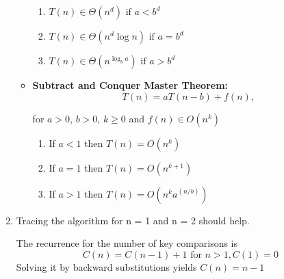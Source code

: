 \documentclass{article}
\begin{document}
\begin{enumerate}
\begin{itemize}
    \begin{enumerate}
    \item $T(n) \in \Theta(n^d) \text{ if } a < b^d$
    \item $T(n) \in \Theta(n^d \log n) \text{ if } a = b^d$
    \item $T(n) \in \Theta(n^{\log_ba}) \text{ if } a > b^d$
    \end{enumerate}

    \item \textbf{Subtract and Conquer Master Theorem:} 
    \begin{equation*}
    T(n) = aT(n-b) + f(n),
    \end{equation*}
    
    for $a>0$, $b>0$, $k\geq0$ and $f(n) \in O(n^k)$

    \begin{enumerate}
    \item If $a<1$ then $T(n)=O(n^k)$
    \item If $a=1$ then $T(n)=O(n^{k+1})$
    \item If $a>1$ then $T(n)=O(n^ka^(n/b))$
    \end{enumerate}

\end{itemize}


\item Tracing the algorithm for n = 1 and n = 2 should help.

The recurrence for the number of key comparisons is
\begin{equation}
  C(n) = C(n-1)+1 \text{ for } n>1, C(1)=0  
\end{equation}
Solving it by backward substitutions yields $C(n)=n-1$


\end{enumerate}
\end{document}
